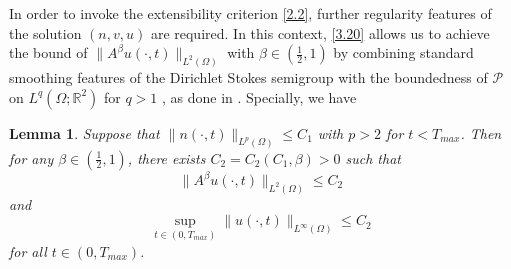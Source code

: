 \documentclass[12pt]{article}
\theoremstyle{plain}
\newtheorem{lemma}{Lemma}[section]
\theoremstyle{definition}
\numberwithin{equation}{section}
\begin{document}
In order to invoke the extensibility criterion \eqref{2.2}, further regularity features of the solution $(n,v,u)$ are required.
In this context,  \eqref{3.20} allows us to achieve the bound of $\|A^\beta u(\cdot,t)\|_{L^2(\Omega)}$ with $\beta\in (\frac 12,1)$
by combining standard smoothing features of the Dirichlet Stokes semigroup with the boundedness of $\mathcal{P}$
on $L^q(\Omega; \mathbb{R}^2)$ for $q>1$ \cite{FM}, as done in \cite{Fuest}. Specially, we have
\begin{lemma}\label{lemma3.7} Suppose that  $\|n(\cdot,t)\|_{L^p(\Omega)} \leq C_1$ with $p>2$ for $t<T_{max}$. Then for any $\beta\in (\frac 12,1)$, there exists  $C_2=C_2(C_1,\beta)>0$ such that
\begin{equation}\label{3.23}
\|A^\beta u(\cdot,t)\|_{L^2(\Omega)} \leq C_2
\end{equation}
and
\begin{equation}\label{3.24}
\sup_{t\in (0,T_{max})}\|u(\cdot,t)\|_{L^\infty(\Omega)} \leq C_2
\end{equation}
for all $t\in (0, T_{max})$.
\end{lemma}
\end{document}

